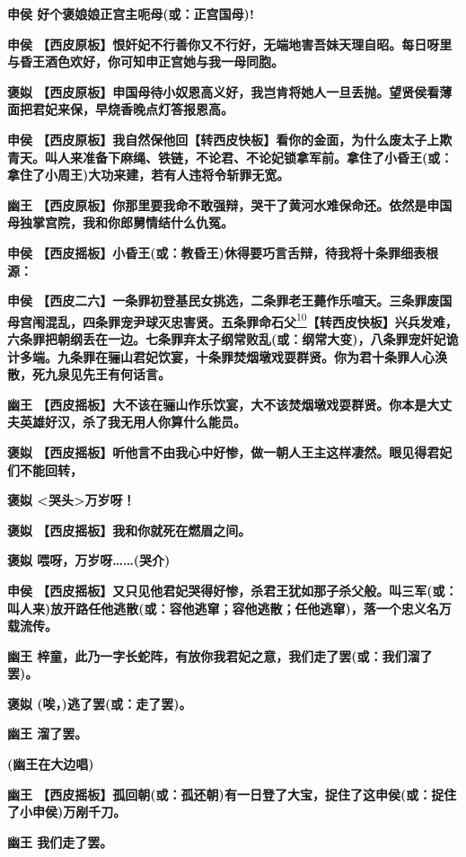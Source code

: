 \textbf{申侯 好个褒娘娘正宫主呃母(或：正宫国母)!}

\textbf{申侯
【西皮原板】恨奸妃不行善你又不行好，无端地害吾妹天理自昭。每日呀里与昏王酒色欢好，你可知申正宫她与我一母同胞。}

\textbf{褒姒
【西皮原板】申国母待小奴恩高义好，我岂肯将她人一旦丢抛。望贤侯看薄面把君妃来保，早烧香晚点灯答报恩高。}

\textbf{申侯
【西皮原板】我自然保他回【转西皮快板】看你的金面，为什么废太子上欺青天。叫人来准备下麻绳、铁链，不论君、不论妃锁拿军前。拿住了小昏王(或：拿住了小周王)大功来建，若有人违将令斩罪无宽。}

\textbf{幽王
【西皮原板】你那里要我命不敢强辩，哭干了黄河水难保命还。依然是申国母独掌宫院，我和你郎舅情结什么仇冤。}

\textbf{申侯
【西皮摇板】小昏王(或：教昏王)休得要巧言舌辩，待我将十条罪细表根源：}

\textbf{申侯
【西皮二六】一条罪初登基民女挑选，二条罪老王薨作乐喧天。三条罪废国母宫闱混乱，四条罪宠尹球灭忠害贤。五条罪命石父}\protect\hyperlink{fn10}{\textsuperscript{10}}\textbf{【转西皮快板】兴兵发难，六条罪把朝纲丢在一边。七条罪弃太子纲常败乱(或：纲常大变)，八条罪宠奸妃诡计多端。九条罪在骊山君妃饮宴，十条罪焚烟墩戏耍群贤。你为君十条罪人心涣散，死九泉见先王有何话言。}

\textbf{幽王
【西皮摇板】大不该在骊山作乐饮宴，大不该焚烟墩戏耍群贤。你本是大丈夫英雄好汉，杀了我无用人你算什么能员。}

\textbf{褒姒
【西皮摇板】听他言不由我心中好惨，做一朝人王主这样凄然。眼见得君妃们不能回转，}

\textbf{褒姒 \textless{}哭头\textgreater{}万岁呀！}

\textbf{褒姒 【西皮摇板】我和你就死在燃眉之间。}

\textbf{褒姒 喂呀，万岁呀\ldots{}\ldots{}(哭介)}

\textbf{申侯
【西皮摇板】又只见他君妃哭得好惨，杀君王犹如那子杀父般。叫三军(或：叫人来)放开路任他逃散(或：容他逃窜；容他逃散；任他逃窜)，落一个忠义名万载流传。}

\textbf{幽王
梓童，此乃一字长蛇阵，有放你我君妃之意，我们走了罢(或：我们溜了罢)。}

\textbf{褒姒 (唉，)逃了罢(或：走了罢)。}

\textbf{幽王 溜了罢。}

\textbf{(幽王在大边唱)}

\textbf{幽王
【西皮摇板】孤回朝(或：孤还朝)有一日登了大宝，捉住了这申侯(或：捉住了小申侯)万剐千刀。}

\textbf{幽王 我们走了罢。}

